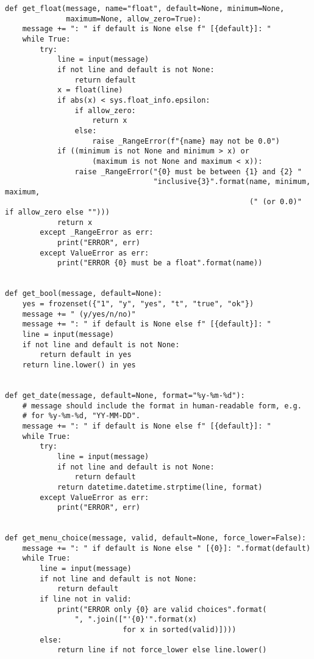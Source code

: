 \begin{lstlisting}
def get_float(message, name="float", default=None, minimum=None,
              maximum=None, allow_zero=True):
    message += ": " if default is None else f" [{default}]: "
    while True:
        try:
            line = input(message)
            if not line and default is not None:
                return default
            x = float(line)
            if abs(x) < sys.float_info.epsilon:
                if allow_zero:
                    return x
                else:
                    raise _RangeError(f"{name} may not be 0.0")
            if ((minimum is not None and minimum > x) or
                    (maximum is not None and maximum < x)):
                raise _RangeError("{0} must be between {1} and {2} "
                                  "inclusive{3}".format(name, minimum, maximum,
                                                        (" (or 0.0)" if allow_zero else "")))
            return x
        except _RangeError as err:
            print("ERROR", err)
        except ValueError as err:
            print("ERROR {0} must be a float".format(name))


def get_bool(message, default=None):
    yes = frozenset({"1", "y", "yes", "t", "true", "ok"})
    message += " (y/yes/n/no)"
    message += ": " if default is None else f" [{default}]: "
    line = input(message)
    if not line and default is not None:
        return default in yes
    return line.lower() in yes


def get_date(message, default=None, format="%y-%m-%d"):
    # message should include the format in human-readable form, e.g.
    # for %y-%m-%d, "YY-MM-DD".
    message += ": " if default is None else f" [{default}]: "
    while True:
        try:
            line = input(message)
            if not line and default is not None:
                return default
            return datetime.datetime.strptime(line, format)
        except ValueError as err:
            print("ERROR", err)


def get_menu_choice(message, valid, default=None, force_lower=False):
    message += ": " if default is None else " [{0}]: ".format(default)
    while True:
        line = input(message)
        if not line and default is not None:
            return default
        if line not in valid:
            print("ERROR only {0} are valid choices".format(
                ", ".join(["'{0}'".format(x)
                           for x in sorted(valid)])))
        else:
            return line if not force_lower else line.lower()
  
\end{lstlisting}

